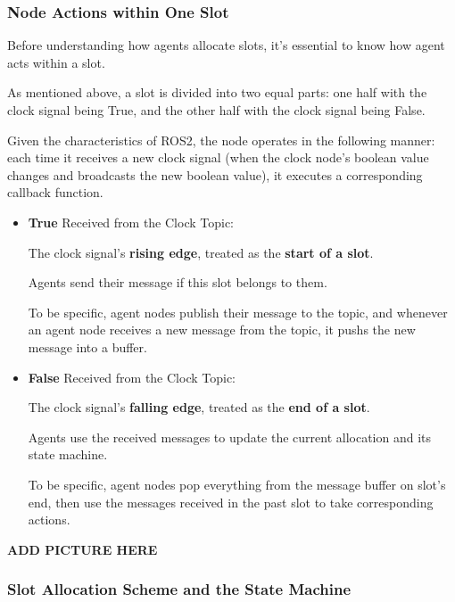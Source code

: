 \subsubsection{Node Actions within One Slot}


Before understanding how agents allocate slots, it's essential to know how agent acts within a slot.

As mentioned above, a slot is divided into two equal parts: one half with the clock signal being True, and the other half with the clock signal being False.

Given the characteristics of ROS2, the node operates in the following manner: each time it receives a new clock signal (when the clock node's boolean value changes and broadcasts the new boolean value), it executes a corresponding callback function.

\begin{itemize}
    \item \textbf{True} Received from the Clock Topic: 
    
    The clock signal's \textbf{rising edge}, treated as the \textbf{start of a slot}.

    Agents send their message if this slot belongs to them. 

    To be specific, agent nodes publish their message to the topic, and whenever an agent node receives a new message from the topic, it pushs the new message into a buffer.


    
    \item \textbf{False} Received from the Clock Topic:
    
    The clock signal's \textbf{falling edge}, treated as the \textbf{end of a slot}.
    
    Agents use the received messages to update the current allocation and its state machine.

    To be specific, agent nodes pop everything from the message buffer on slot's end, then use the messages received in the past slot to take corresponding actions.
\end{itemize}

\textbf{ADD PICTURE HERE}

\subsubsection{Slot Allocation Scheme and the State Machine}

